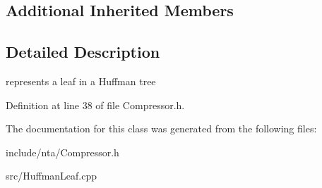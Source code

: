 \subsection*{Additional Inherited Members}


\subsection{Detailed Description}
represents a leaf in a Huffman tree 

Definition at line 38 of file Compressor.\+h.



The documentation for this class was generated from the following files\+:\begin{DoxyCompactItemize}
\item 
include/nta/Compressor.\+h\item 
src/Huffman\+Leaf.\+cpp\end{DoxyCompactItemize}
